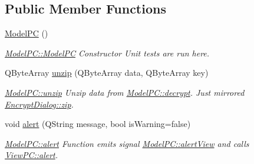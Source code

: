\subsection*{Public Member Functions}
\begin{DoxyCompactItemize}
\item 
\mbox{\hyperlink{class_model_p_c_ae12ebe65ec973c02a0de4850a7c1e31c}{Model\+PC}} ()
\begin{DoxyCompactList}\small\item\em \mbox{\hyperlink{class_model_p_c_ae12ebe65ec973c02a0de4850a7c1e31c}{Model\+P\+C\+::\+Model\+PC}} Constructor Unit tests are run here. \end{DoxyCompactList}\item 
Q\+Byte\+Array \mbox{\hyperlink{class_model_p_c_a6da88f166785a49f73b22c169f956fd0}{unzip}} (Q\+Byte\+Array data, Q\+Byte\+Array key)
\begin{DoxyCompactList}\small\item\em \mbox{\hyperlink{class_model_p_c_a6da88f166785a49f73b22c169f956fd0}{Model\+P\+C\+::unzip}} Unzip data from \mbox{\hyperlink{class_model_p_c_af1f0b21565bf39808c4cdd448fad0ea8}{Model\+P\+C\+::decrypt}}. Just mirrored \mbox{\hyperlink{class_encrypt_dialog_a2bff820a3df4ddc36ecb07ed74b7138a}{Encrypt\+Dialog\+::zip}}. \end{DoxyCompactList}\item 
void \mbox{\hyperlink{class_model_p_c_a9079a101d83672aa48fd2dbac797de40}{alert}} (Q\+String message, bool is\+Warning=false)
\begin{DoxyCompactList}\small\item\em \mbox{\hyperlink{class_model_p_c_a9079a101d83672aa48fd2dbac797de40}{Model\+P\+C\+::alert}} Function emits signal \mbox{\hyperlink{class_model_p_c_aef1f058227af54e4cfc9fc4c4397d30c}{Model\+P\+C\+::alert\+View}} and calls \mbox{\hyperlink{class_view_p_c_a7c467169467789561078abc9d4fe57bd}{View\+P\+C\+::alert}}. \end{DoxyCompactList}\end{DoxyCompactItemize}
